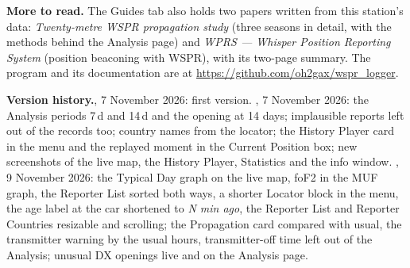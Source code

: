 \documentclass[10pt,a4paper]{article}
\newcommand{\ui}[1]{\textsf{\small #1}}            %
\newcommand{\lead}[1]{\textbf{#1}\enspace}           %
\begin{document}
\lead{More to read.} The \ui{Guides} tab also holds two papers written from this station's data: \emph{Twenty-metre WSPR propagation study} (three seasons in detail, with the methods behind the Analysis page) and \emph{WPRS --- Whisper Position Reporting System} (position beaconing with WSPR), with its two-page summary. The program and its documentation are at \url{https://github.com/oh2gax/wspr_logger}.

\vfill
{\small\textbf{Version history.}, 7 November 2026: first version. , 7 November 2026: the Analysis periods 7\,d and 14\,d and the opening at 14 days; implausible reports left out of the records too; country names from the locator; the History Player card in the menu and the replayed moment in the Current Position box; new screenshots of the live map, the History Player, Statistics and the info window. , 9 November 2026: the Typical Day graph on the live map, foF2 in the MUF graph, the Reporter List sorted both ways, a shorter Locator block in the menu, the age label at the car shortened to \emph{N min ago}, the Reporter List and Reporter Countries resizable and scrolling; the Propagation card compared with usual, the transmitter warning by the usual hours, transmitter-off time left out of the Analysis; unusual DX openings live and on the Analysis page.}
\end{document}
